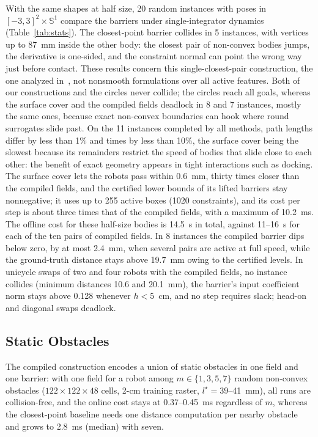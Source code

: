 \documentclass[journal]{IEEEtran}
\theoremstyle{definition}
\newcommand{\Sone}{\mathbb{S}^1}
\begin{document}
With the same shapes at half size, 20 random instances with poses in $[-3,3]^2\times\Sone$ compare
the barriers under single-integrator dynamics (Table~\ref{tab:stats}). The closest-point barrier
collides in 5 instances, with vertices up to 87~mm inside the other body: the closest pair of
non-convex bodies jumps, the derivative is one-sided, and the constraint normal can point the wrong
way just before contact. These results concern this single-closest-pair construction, the one
analyzed in~\cite{jo2026geometry}, not nonsmooth formulations over all active features. Both of our
constructions and the circles never collide; the circles reach all goals, whereas the surface cover
and the compiled fields deadlock in 8 and 7 instances, mostly the same ones, because exact
non-convex boundaries can hook where round surrogates slide past. On the 11 instances completed by all
methods, path lengths differ by less than 1\% and times by less than 10\%, the surface cover being the
slowest because its remainders restrict the speed of bodies that slide close to each other: the
benefit of exact geometry appears in tight interactions such as docking. The surface cover lets the
robots pass within 0.6~mm, thirty times closer than the compiled fields, and the certified lower
bounds of its lifted barriers stay nonnegative; it uses up to 255 active boxes (1020 constraints),
and its cost per step is about three times that of the compiled fields, with a maximum of 10.2~ms.
The offline cost for these half-size bodies is 14.5~s in total, against 11--16~s for each of the
ten pairs of compiled fields. In 8 instances the compiled barrier dips below zero, by at
most 2.4~mm, when several pairs are active at full speed, while the ground-truth distance stays
above 19.7~mm owing to the certified levels. In unicycle swaps of two and four robots with the
compiled fields, no instance
collides (minimum distances 10.6 and 20.1~mm), the barrier's input coefficient norm stays above 0.128
whenever $h<5$~cm, and no step requires slack; head-on and diagonal swaps deadlock.

\subsection{Static Obstacles}\label{sec:exp-static}
The compiled construction encodes a union of static obstacles in one field and one barrier: with one
field for a robot among $m\in\{1,3,5,7\}$ random non-convex obstacles
($122\times122\times48$ cells, 2-cm training raster, $l^\star=39$--41~mm), all runs are
collision-free, and the online cost stays at 0.37--0.45~ms regardless of $m$, whereas the
closest-point baseline needs one distance computation per nearby obstacle and grows to 2.8~ms
(median) with seven.
\end{document}
